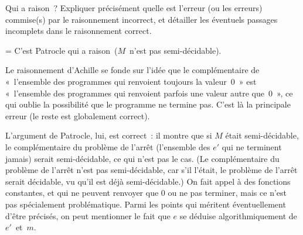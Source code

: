 \documentclass[12pt,a4paper]{article}
\theoremstyle{definition}
\newif\ifcorrige
\newenvironment{corrige}%
{\ifcorrige\relax\else\setbox0=\vbox\bgroup\fi%
\smallbreak\footnotesize\noindent{\underbar{\textit{Corrigé.}}\quad}}
{{\hbox{}\nobreak\hfill\checkmark}%
\ifcorrige\relax\else\egroup\fi\par}
\begin{document}
\smallskip

\noindent Qui a raison ?  Expliquer précisément quelle est l'erreur
(ou les erreurs) commise(s) par le raisonnement incorrect, et
détailler les éventuels passages incomplets dans le raisonnement
correct.

\begin{corrige}
C'est Patrocle qui a raison ($M$ n'est pas semi-décidable).

Le raisonnement d'Achille se fonde sur l'idée que le complémentaire de
« l'ensemble des programmes qui renvoient toujours la valeur $0$ » est
« l'ensemble des programmes qui renvoient parfois une valeur autre
que $0$ », ce qui oublie la possibilité que le programme ne termine
pas.  C'est là la principale erreur (le reste est globalement
correct).

L'argument de Patrocle, lui, est correct : il montre que si $M$ était
semi-décidable, le complémentaire du problème de l'arrêt (l'ensemble
des $e'$ qui ne terminent jamais) serait semi-décidable, ce qui n'est
pas le cas.  (Le complémentaire du problème de l'arrêt n'est pas
semi-décidable, car s'il l'était, le problème de l'arrêt serait
décidable, vu qu'il est déjà semi-décidable.)  On fait appel à des
fonctions constantes, et qui ne peuvent renvoyer que $0$ ou ne pas
terminer, mais ce n'est pas spécialement problématique.  Parmi les
points qui méritent éventuellement d'être précisés, on peut mentionner
le fait que $e$ se déduise algorithmiquement de $e'$ et $m$.
\end{corrige}



%
%
%

\printindex







%
%
%
\end{document}
